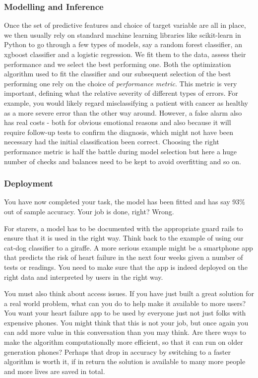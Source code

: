 \documentclass[
]{book}
\theoremstyle{definition}
\theoremstyle{definition}
\theoremstyle{definition}
\theoremstyle{definition}
\theoremstyle{remark}
\begin{document}
\hypertarget{modelling-and-inference}{%
\subsubsection{Modelling and Inference}\label{modelling-and-inference}}

Once the set of predictive features and choice of target variable are all in place, we then usually rely on standard machine learning libraries like scikit-learn in Python to go through a few types of models, say a random forest classifier, an xgboost classifier and a logistic regression. We fit them to the data, assess their performance and we select the best performing one. Both the optimization algorithm used to fit the classifier and our subsequent selection of the best performing one rely on the choice of \emph{performance metric}. This metric is very important, defining what the relative severity of different types of errors. For example, you would likely regard misclassifying a patient with cancer as healthy as a more severe error than the other way around. However, a false alarm also has real costs - both for obvious emotional reasons and also because it will require follow-up tests to confirm the diagnosis, which might not have been necessary had the initial classification been correct. Choosing the right performance metric is half the battle during model selection but here a huge number of checks and balances need to be kept to avoid overfitting and so on.

\hypertarget{deployment}{%
\subsubsection{Deployment}\label{deployment}}

You have now completed your task, the model has been fitted and has say 93\% out of sample accuracy. Your job is done, right? Wrong.

For starers, a model has to be documented with the appropriate guard rails to ensure that it is used in the right way. Think back to the example of using our cat-dog classifier to a giraffe. A more serious example might be a smartphone app that predicts the risk of heart failure in the next four weeks given a number of tests or readings. You need to make sure that the app is indeed deployed on the right data and interpreted by users in the right way.

You must also think about access issues. If you have just built a great solution for a real world problem, what can you do to help make it available to more users? You want your heart failure app to be used by everyone just not just folks with expensive phones. You might think that this is not your job, but once again you can add more value in this conversation than you may think. Are there ways to make the algorithm computationally more efficient, so that it can run on older generation phones? Perhaps that drop in accuracy by switching to a faster algorithm is worth it, if in return the solution is available to many more people and more lives are saved in total.
\end{document}
